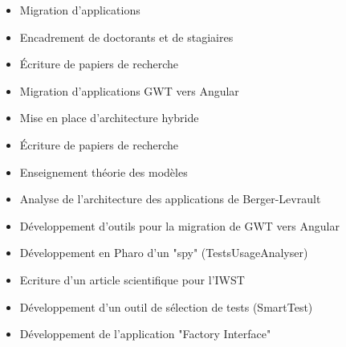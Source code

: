 \documentclass[10pt,a4paper,ragged2e,withhyper]{altacv}
\begin{document}
\begin{paracol}{2}

\begin{itemize}
\item Migration d'applications
\item Encadrement de doctorants et de stagiaires
\item Écriture de papiers de recherche
\end{itemize}

\divider

\begin{itemize}
\item Migration d'applications GWT vers Angular
\item Mise en place d'architecture hybride
\item Écriture de papiers de recherche
\item Enseignement théorie des modèles
\end{itemize}

\divider

\begin{itemize}
\item Analyse de l’architecture des applications de Berger-Levrault
\item Développement d'outils pour la migration de GWT vers Angular
\end{itemize}

\divider

\begin{itemize}
  \item Développement en Pharo d'un "spy" (TestsUsageAnalyser)
  \item Ecriture d'un article scientifique pour l'IWST
  \item Développement d'un outil de sélection de tests (SmartTest)
\end{itemize}

\divider

\begin{itemize}
  \item Développement de l'application "Factory Interface"
\end{itemize}



\end{paracol}
\end{document}
